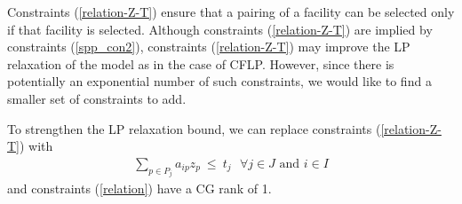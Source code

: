 Constraints (\ref{relation-Z-T})  ensure that a pairing of a facility can be selected 
only if that facility is selected. Although constraints (\ref{relation-Z-T}) are implied 
by constraints (\ref{spp_con2}), constraints (\ref{relation-Z-T}) may improve the 
LP relaxation of the model as in the case of CFLP. However, since there is potentially 
an exponential number of such constraints, we would like to find a smaller set of 
constraints to add. 
\begin {prop} 
  To strengthen the LP relaxation bound, we can replace constraints (\ref{relation-Z-T}) with 
  \begin{eqnarray}
    \label{relation}
    \sum_{p \in P_{j}}a_{ip}z_{p}\ \leq \ t_{j} \mbox{\ \ $\forall j \in J$ and $i \in I$} 
  \end{eqnarray}
and constraints (\ref{relation}) have a CG rank of 1.
\end{prop}
 
